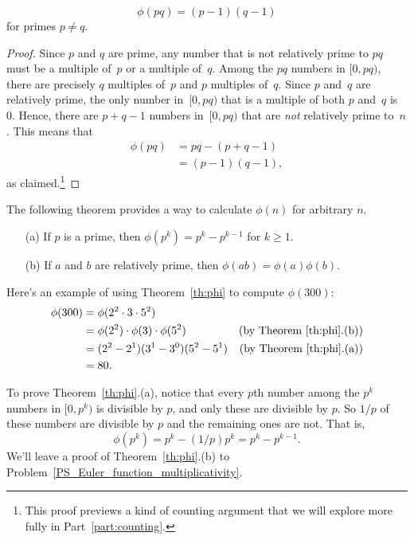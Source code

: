 \begin{lemma}\label{phi_pq}    %
\[
\phi(pq) = (p-1) (q-1)
\]
for primes $p\neq q$.
\end{lemma}

\begin{proof}
Since $p$ and $q$ are prime, any number that is not relatively prime to $pq$ must be a
multiple of~$p$ or a multiple of~$q$.  Among the $pq$ numbers in $[0, pq)$, there are
  precisely $q$ multiples of~$p$ and $p$ multiples of~$q$.  Since $p$ and~$q$ are
  relatively prime, the only number in~$[0, pq)$ that is a multiple of both $p$ and~$q$ is
    0.  Hence, there are $p + q - 1$ numbers in~$[0, pq)$ that are \emph{not} relatively
      prime to~$n$.  This means that
\begin{align*}
    \phi(pq) & = pq - (p + q - 1) \\ & = (p - 1) (q - 1),
\end{align*}
as claimed.\footnote{This proof previews a kind of counting argument that we will explore
  more fully in Part~\ref{part:counting}.}
\end{proof}

The following theorem provides a way to calculate $\phi(n)$ for arbitrary $n$.
\begin{theorem}\label{th:phi}\mbox{}
\begin{enumerate}
\item[(a)] If $p$ is a prime, then $\phi(p^k) = p^k - p^{k-1}$ for $k \geq 1$.
\item[(b)] If $a$ and $b$ are relatively prime, then $\phi(ab) = \phi(a)\phi(b)$.
\end{enumerate}
\end{theorem}

Here's an example of using Theorem~\ref{th:phi} to compute $\phi(300)$:
\begin{align*}
\phi(300) & = \phi(2^2 \cdot 3 \cdot 5^2)\\ & = \phi(2^2) \cdot \phi(3) \cdot \phi(5^2) &
\text{(by Theorem~\ref{th:phi}.(b))}\\ & = (2^2 - 2^1) (3^1 - 3^0) (5^2 - 5^1) & \text{(by
  Theorem~\ref{th:phi}.(a))}\\ & = 80.
\end{align*}

To prove Theorem~\ref{th:phi}.(a), notice that every $p$th number among the $p^k$ numbers
in $[0, p^{k})$ is divisible by $p$, and only these are divisible by $p$.  So $1/p$ of
  these numbers are divisible by $p$ and the remaining ones are not.  That is,
\[
\phi(p^{k}) = p^k - (1/p)p^k = p^k -p^{k-1}.
\]
We'll leave a proof of Theorem~\ref{th:phi}.(b) to
Problem~\ref{PS_Euler_function_multiplicativity}.

